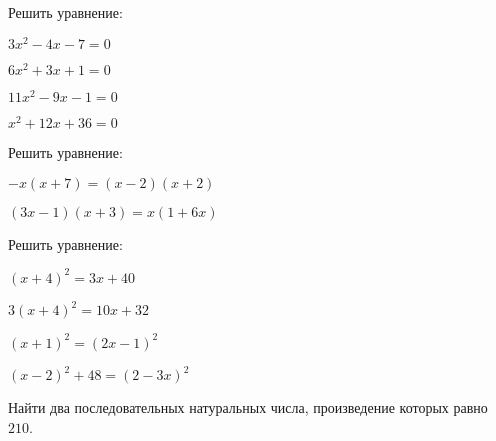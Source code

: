\begin{class}[number=4]
	\begin{listofex}
		\item Решить уравнение:
		\begin{enumcols}[itemcolumns=2]
			\item \( 3x^2-4x-7=0 \)
			\item \( 6x^2+3x+1=0 \)
			\item \( 11x^2-9x-1=0 \)
			\item \( x^2+12x+36=0 \)
		\end{enumcols}
		\item Решить уравнение:
		\begin{enumcols}[itemcolumns=2]
			\item \( -x(x+7)=(x-2)(x+2) \)
			\item \( (3x-1)(x+3)=x(1+6x) \)
		\end{enumcols}
		\item Решить уравнение:
		\begin{enumcols}[itemcolumns=2]
			\item \( (x+4)^2=3x+40 \)
			\item \( 3(x+4)^2=10x+32 \)
			\item \( (x+1)^2=(2x-1)^2 \)
			\item \( (x-2)^2+48=(2-3x)^2 \)
		\end{enumcols}
		\item Найти два последовательных натуральных числа, произведение которых равно \( 210 \).
	\end{listofex}
\end{class}
%
%
